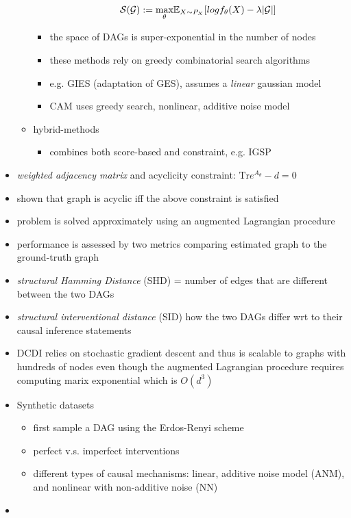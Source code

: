 \begin{itemize}
\begin{itemize}
\begin{itemize}
      \begin{equation*}
        \mathcal{S}(\mathcal{G}) := \underset{\theta}{\text{max}} \mathbb{E}_{X \sim P_{X}}[log f_{\theta}(X) - \lambda |\mathcal{G}|]
      \end{equation*}
      \item the space of DAGs is super-exponential in the number of nodes
      \item these methods rely on greedy combinatorial search algorithms
      \item e.g. GIES (adaptation of GES), assumes a \textit{linear} gaussian model
      \item CAM uses greedy search, nonlinear, additive noise model
    \end{itemize}
    \item hybrid-methods
    \begin{itemize}
      \item combines both score-based and constraint, e.g. IGSP
    \end{itemize}
  \end{itemize}

  \item \textit{weighted adjacency matrix} and acyclicity constraint: $\text{Tr}e^{A_{\theta}} - d = 0$
  \item shown that graph is acyclic iff the above constraint is satisfied
  \item problem is solved approximately using an augmented Lagrangian procedure
  \item performance is assessed by two metrics comparing estimated graph to the ground-truth graph
  \item \textit{structural Hamming Distance} (SHD) = number of edges that are different between the two DAGs
  \item \textit{structural interventional distance} (SID) how the two DAGs differ wrt to their causal inference statements
  \item DCDI relies on stochastic gradient descent and thus is scalable to graphs with hundreds of nodes even though the augmented Lagrangian procedure requires computing marix exponential which is $O(d^{3})$
  \item Synthetic datasets
  \begin{itemize}
    \item first sample a DAG using the Erdos-Renyi scheme
    \item perfect v.s. imperfect interventions
    \item different types of causal mechanisms: linear, additive noise model (ANM), and nonlinear with non-additive noise (NN)
  \end{itemize}
  \item\end{itemize}